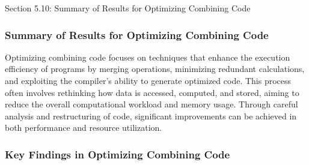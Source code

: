 \begin{notes}{Section 5.10: Summary of Results for Optimizing Combining Code}
    \subsubsection*{Summary of Results for Optimizing Combining Code}

    Optimizing combining code focuses on techniques that enhance the execution efficiency of programs by merging operations, minimizing redundant calculations, and exploiting the compiler's ability 
    to generate optimized code. This process often involves rethinking how data is accessed, computed, and stored, aiming to reduce the overall computational workload and memory usage. Through careful 
    analysis and restructuring of code, significant improvements can be achieved in both performance and resource utilization. \vspace*{1em}
    
    \subsubsection*{Key Findings in Optimizing Combining Code}
    

\end{notes}
